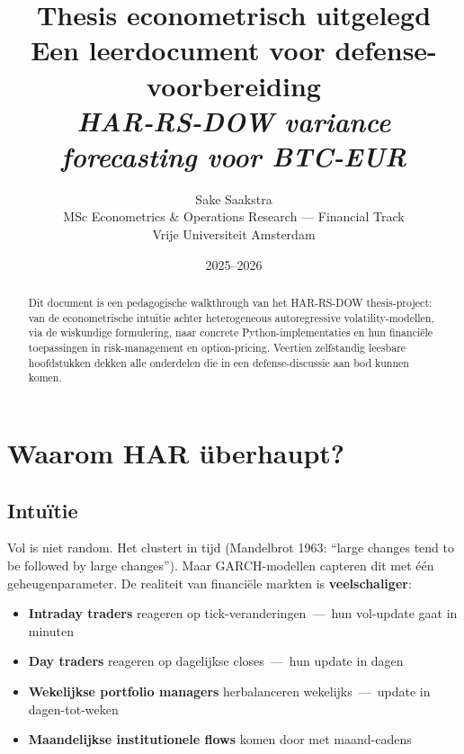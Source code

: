 \documentclass[11pt,a4paper]{article}
\title{
    \vspace{-1cm}
    \Large\textbf{Thesis econometrisch uitgelegd}\\[0.3em]
    \large Een leerdocument voor defense-voorbereiding\\[0.5em]
    \normalsize\textit{HAR-RS-DOW variance forecasting voor BTC-EUR}
}
\author{
    Sake Saakstra\\
    \small MSc Econometrics \& Operations Research --- Financial Track\\
    \small Vrije Universiteit Amsterdam
}
\date{2025--2026}
\begin{document}
\maketitle

\begin{abstract}
\noindent Dit document is een pedagogische walkthrough van het HAR-RS-DOW thesis-project: van de econometrische intuïtie achter heterogeneous autoregressive volatility-modellen, via de wiskundige formulering, naar concrete Python-implementaties en hun financiële toepassingen in risk-management en option-pricing. Veertien zelfstandig leesbare hoofdstukken dekken alle onderdelen die in een defense-discussie aan bod kunnen komen.
\end{abstract}

\tableofcontents
\newpage


\hypertarget{waarom-har-uxfcberhaupt}{%
\section{Waarom HAR überhaupt?}\label{waarom-har-uxfcberhaupt}}

\hypertarget{intuuxeftie}{%
\subsection{Intuïtie}\label{intuuxeftie}}

Vol is niet random. Het clustert in tijd (Mandelbrot 1963: ``large changes tend to be followed by large changes''). Maar GARCH-modellen capteren dit met één geheugenparameter. De realiteit van financiële markten is \textbf{veelschaliger}:

\begin{itemize}
\tightlist
\item
  \textbf{Intraday traders} reageren op tick-veranderingen \,---\, hun vol-update gaat in minuten
\item
  \textbf{Day traders} reageren op dagelijkse closes \,---\, hun update in dagen
\item
  \textbf{Wekelijkse portfolio managers} herbalanceren wekelijks \,---\, update in dagen-tot-weken
\item
  \textbf{Maandelijkse institutionele flows} komen door met maand-cadens
\end{itemize}
\end{document}

